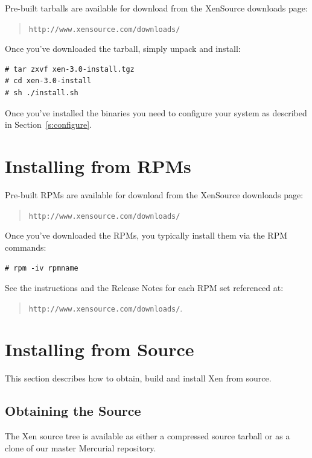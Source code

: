 \documentclass[11pt,twoside,final,openright]{report}
\begin{document}
Pre-built tarballs are available for download from the XenSource downloads
page:
\begin{quote} {\tt http://www.xensource.com/downloads/}
\end{quote}

Once you've downloaded the tarball, simply unpack and install:
\begin{verbatim}
# tar zxvf xen-3.0-install.tgz
# cd xen-3.0-install
# sh ./install.sh
\end{verbatim}

Once you've installed the binaries you need to configure your system as
described in Section~\ref{s:configure}.

\section{Installing from RPMs}
Pre-built RPMs are available for download from the XenSource downloads
page:
\begin{quote} {\tt http://www.xensource.com/downloads/}
\end{quote}

Once you've downloaded the RPMs, you typically install them via the 
RPM commands: 

\verb|# rpm -iv rpmname| 

See the instructions and the Release Notes for each RPM set referenced at:
  \begin{quote}
    {\tt http://www.xensource.com/downloads/}.
  \end{quote}
 
\section{Installing from Source}

This section describes how to obtain, build and install Xen from source.

\subsection{Obtaining the Source}

The Xen source tree is available as either a compressed source tarball
or as a clone of our master Mercurial repository.
\end{document}
